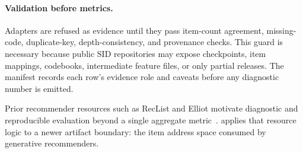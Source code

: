 \paragraph{Validation before metrics.}
Adapters are refused as evidence until they pass item-count agreement,
missing-code, duplicate-key, depth-consistency, and provenance checks. This
guard is necessary because public SID repositories may expose checkpoints, item
mappings, codebooks, intermediate feature files, or only partial releases. The
manifest records each row's evidence role and caveats before any diagnostic
number is emitted.

Prior recommender resources such as RecList and Elliot motivate diagnostic and
reproducible evaluation beyond a single aggregate metric~\cite{chia2022reclist,anelli2021elliot}.
\tool applies that resource logic to a newer artifact boundary: the item
address space consumed by generative recommenders.

